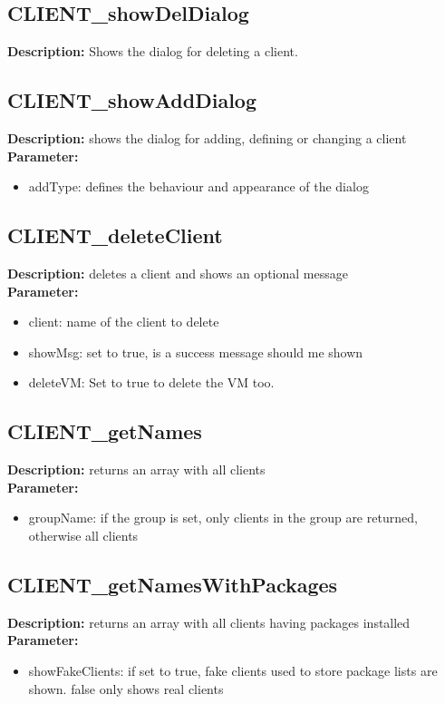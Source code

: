 \subsection{CLIENT\_showDelDialog}
\textbf{Description:} Shows the dialog for deleting a client.\\

\subsection{CLIENT\_showAddDialog}
\textbf{Description:} shows the dialog for adding, defining or changing a client\\
\textbf{Parameter:}
\begin{itemize}
\item addType: defines the behaviour and appearance of the dialog
\end{itemize}

\subsection{CLIENT\_deleteClient}
\textbf{Description:} deletes a client and shows an optional message\\
\textbf{Parameter:}
\begin{itemize}
\item client: name of the client to delete
\item showMsg: set to true, is a success message should me shown
\item deleteVM: Set to true to delete the VM too.
\end{itemize}

\subsection{CLIENT\_getNames}
\textbf{Description:} returns an array with all clients\\
\textbf{Parameter:}
\begin{itemize}
\item groupName: if the group is set, only clients in the group are returned, otherwise all clients
\end{itemize}

\subsection{CLIENT\_getNamesWithPackages}
\textbf{Description:} returns an array with all clients having packages installed\\
\textbf{Parameter:}
\begin{itemize}
\item showFakeClients: if set to true, fake clients used to store package lists are shown. false only shows real clients
\end{itemize}


